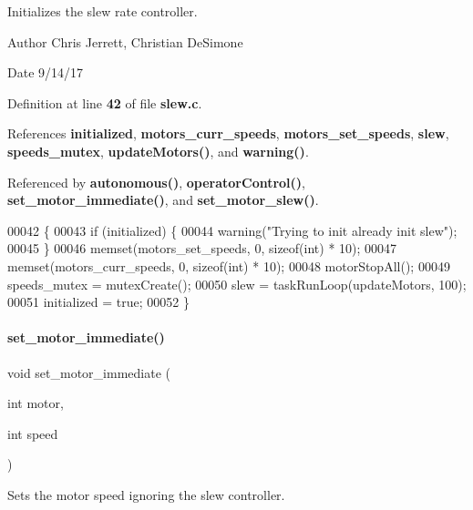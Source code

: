 Initializes the slew rate controller. 

\begin{DoxyAuthor}{Author}
Chris Jerrett, Christian De\+Simone 
\end{DoxyAuthor}
\begin{DoxyDate}{Date}
9/14/17 
\end{DoxyDate}


Definition at line \textbf{ 42} of file \textbf{ slew.\+c}.



References \textbf{ initialized}, \textbf{ motors\+\_\+curr\+\_\+speeds}, \textbf{ motors\+\_\+set\+\_\+speeds}, \textbf{ slew}, \textbf{ speeds\+\_\+mutex}, \textbf{ update\+Motors()}, and \textbf{ warning()}.



Referenced by \textbf{ autonomous()}, \textbf{ operator\+Control()}, \textbf{ set\+\_\+motor\+\_\+immediate()}, and \textbf{ set\+\_\+motor\+\_\+slew()}.


\begin{DoxyCode}
00042                  \{
00043   \textcolor{keywordflow}{if} (initialized) \{
00044     warning(\textcolor{stringliteral}{"Trying to init already init slew"});
00045   \}
00046   memset(motors_set_speeds, 0, \textcolor{keyword}{sizeof}(\textcolor{keywordtype}{int}) * 10);
00047   memset(motors_curr_speeds, 0, \textcolor{keyword}{sizeof}(\textcolor{keywordtype}{int}) * 10);
00048   motorStopAll();
00049   speeds_mutex = mutexCreate();
00050   slew = taskRunLoop(updateMotors, 100);
00051   initialized = \textcolor{keyword}{true};
00052 \}
\end{DoxyCode}
\mbox{\label{a00143_a9f8b8ae577ef938622024545711f0151}} 
\paragraph{set\+\_\+motor\+\_\+immediate()}
{\footnotesize\ttfamily void set\+\_\+motor\+\_\+immediate (\begin{DoxyParamCaption}\item[{int}]{motor,  }\item[{int}]{speed }\end{DoxyParamCaption})}



Sets the motor speed ignoring the slew controller. 


